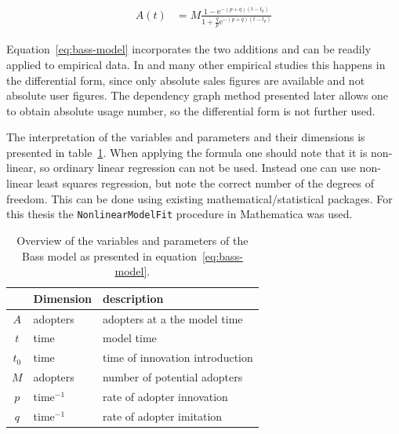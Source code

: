 \documentclass[smallextended,final]{svjour3}
\newcommand{\e}{\mathrm{e}}
\begin{document}
\begin{align} \label{eq:bass-model}
	A(t) &= M \frac{1 - \e^{-(p+q)(t-t_0)}}{1 + \frac{q}{p}\e^{-(p+q)(t-t_0)}}
\end{align}

Equation~\eqref{eq:bass-model} incorporates the two additions and can be readily applied to empirical data. In \cite{mahajan95} and many other empirical studies this happens in the differential form, since only absolute sales figures are available and not absolute user figures. The dependency graph method presented later allows one to obtain absolute usage number, so the differential form is not further used. 


The interpretation of the variables and parameters and their dimensions is presented in table~\ref{tbl:bass-model}. When applying the formula one should note that it is non-linear, so ordinary linear regression can not be used. Instead one can use non-linear least squares regression, but note the correct number of the degrees of freedom. This can be done using existing mathematical/statistical packages. For this thesis the  \verb|NonlinearModelFit| procedure in Mathematica was used. 

\begin{table}\centering\small
\caption[Bass model variables and parameters]{Overview of the variables and parameters of the Bass model as presented in equation~\eqref{eq:bass-model}.}
\label{tbl:bass-model}
\begin{tabular}{cll}
\toprule
& Dimension & description \\
\midrule
$A$   & adopters    & adopters at a the model time \\
$t$   & time        & model time \\
\midrule
$t_0$ & time        & time of innovation introduction \\
$M$   & adopters    & number of potential adopters \\
$p$   & time$^{-1}$ & rate of adopter innovation \\
$q$   & time$^{-1}$ & rate of adopter imitation \\
\bottomrule
\end{tabular}
\end{table}
\end{document}

